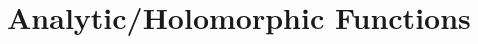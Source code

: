 \documentclass[12pt]{article}
\begin{document}
\setlength{\parindent}{0pt}

\section{Analytic/Holomorphic Functions}

\vspace{-10pt}
\end{document}
